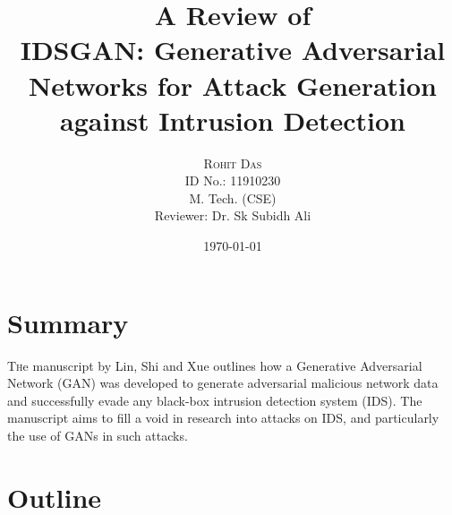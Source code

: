 \documentclass[twoside,twocolumn]{article}
\title{A Review of\\ IDSGAN: Generative Adversarial Networks for Attack Generation against Intrusion Detection} %
\author{%
\Large \textsc{Rohit Das}\\ %
\large ID No.: 11910230\\
\large M. Tech. (CSE)\\
Reviewer: Dr. Sk Subidh Ali}
\date{\today} %
\begin{document}
\maketitle


\section{Summary}

\lettrine[nindent=0em,lines=3]{T} he manuscript by Lin, Shi and Xue outlines how a Generative Adversarial Network (GAN) was developed to generate adversarial malicious network data and successfully evade any black-box intrusion detection system (IDS). The manuscript aims to fill a void in research into attacks on IDS, and particularly the use of GANs in such attacks. 


\section{Outline}
\end{document}
